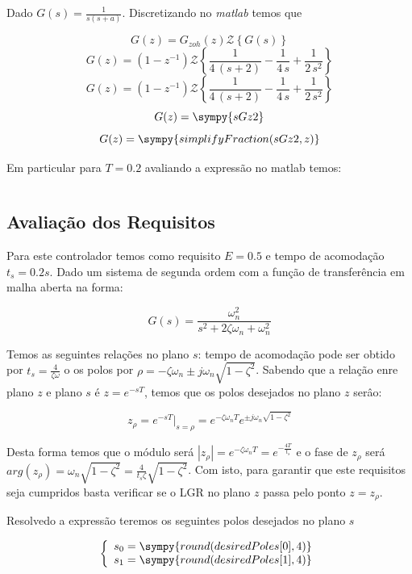 \documentclass[a4paper,11pt]{article}
\begin{document}
Dado $G(s) = \frac{1}{s(s+a)}$. Discretizando no \textit{matlab} temos que


$$G(z) = G_{zoh}(z)\mathcal{Z}\left\{G(s)\right\}$$
$$G(z) = (1-z^{-1})\mathcal{Z}\left\{\frac{1}{4\,\left(s+2\right)}-\frac{1}{4\,s}+\frac{1}{2\,s^2}\right\} $$
$$G(z) = (1-z^{-1})\mathcal{Z}\left\{\frac{1}{4\,\left(s+2\right)}-\frac{1}{4\,s}+\frac{1}{2\,s^2}\right\} $$
$$G(z) = \sympy{sGz2}$$
$$G(z) = \sympy{simplifyFraction(sGz2,z)}$$

Em particular para $T=0.2$ avaliando a expressão no matlab temos:

$$$$

\subsection{Avaliação dos Requisitos}

Para este controlador temos como requisito $E=0.5$ e tempo de acomodação $t_s = 0.2s$. Dado um sistema de segunda ordem com a função de transferência em malha aberta na forma:

\begin{equation}
    G(s) = \frac{\omega_n^2}{s^2 + 2\zeta\omega_n + \omega_n^2}
\end{equation}

Temos as seguintes relações no plano $s$: tempo de acomodação pode ser obtido por $t_s = \frac{4}{\zeta\omega}$
o os polos por $ \rho = -\zeta\omega_n \pm j\omega_n\sqrt{1-\zeta^2}$. Sabendo que a relação enre plano $z$ e plano $s$ é $z=e^{-sT}$, temos que os polos desejados no plano $z$ serâo:

\begin{equation}
    z_{\rho} = e^{-sT}|_{s=\rho} =  e^{-\zeta\omega_n T} e^{\pm j\omega_n\sqrt{1-\zeta^2}}
\end{equation}

Desta forma temos que o módulo será $|z_{\rho}| =  e^{-\zeta\omega_n T} = e^{-\frac{4T}{t_s}}$ e o fase de $z_\rho$ será $arg(z_{\rho}) = \omega_n\sqrt{1-\zeta^2} = \frac{4}{t_s\zeta}\sqrt{1-\zeta^2}$. Com isto, para garantir que este requisitos seja cumpridos basta verificar se o LGR no plano $z$ passa pelo ponto $z = z_{\rho}$.

Resolvedo a expressão teremos os seguintes polos desejados no plano $s$

$$
\left\{
\begin{array}{l}
    s_0 = \sympy{round(desiredPoles[0],4)}\\
    s_1 = \sympy{round(desiredPoles[1],4)}
\end{array}
\right.
$$
\end{document}
